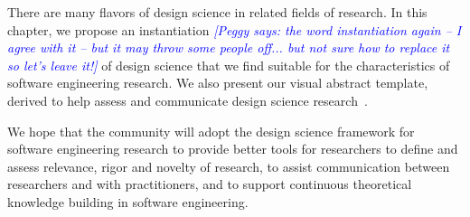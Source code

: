 \documentclass[graybox]{svmult}
\newcommand{\peggy}[1]{\textcolor{blue}{{\it [Peggy says: #1]}}}
\newcommand{\peggy}[1]{}
\begin{document}
There are many flavors of design science in related fields of research. In this chapter, we propose an instantiation \peggy{the word instantiation again -- I agree with it -- but it may throw some people off... but not sure how to replace it so let's leave it!} of design science that we find suitable for the characteristics of software engineering research. We also present our visual abstract template, derived to help assess and communicate design science research~\cite{StoreyESEM17}. 

We hope that the community will adopt the design science framework for software engineering research to provide better tools for researchers to define and assess relevance, rigor and novelty of research, to assist communication between researchers and with practitioners, and to support continuous theoretical knowledge building in software engineering. 




\end{document}
